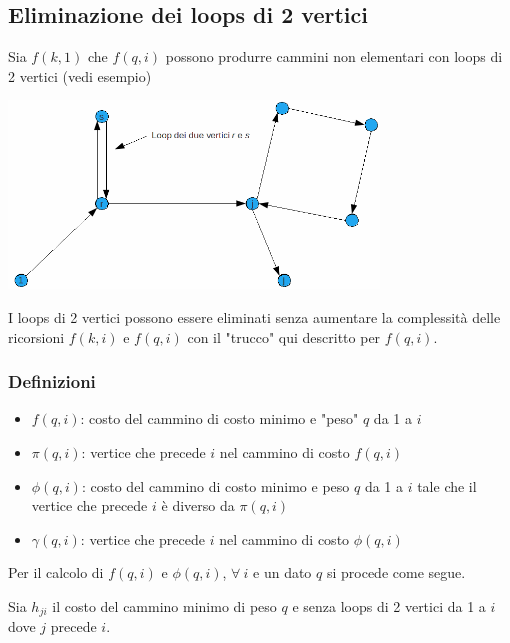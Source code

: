 \subsection{Eliminazione dei loops di 2 vertici}
Sia $f(k,1)$ che $f(q,i)$ possono produrre cammini non elementari con loops di 2 vertici (vedi esempio)

\centerline{\includegraphics[height=5cm]{images/graph48.png}}
I loops di 2 vertici possono essere eliminati senza aumentare la complessità delle ricorsioni $f(k,i)$ e $f(q,i)$ con il "trucco" qui descritto per $f(q,i)$.
\clearpage
\subsubsection{Definizioni}
\begin{itemize}
	\item $f(q,i)$: costo del cammino di costo minimo e "peso" $q$ da 1 a $i$
	\item $\pi(q,i)$: vertice che precede $i$ nel cammino di costo $f(q,i)$
	\item $\phi(q,i)$: costo del cammino di costo minimo e peso $q$ da 1 a $i$ tale che il vertice che precede $i$ è diverso da $\pi(q,i)$
	\item $\gamma(q,i)$: vertice che precede $i$ nel cammino di costo $\phi(q,i)$
\end{itemize}

Per il calcolo di $f(q,i)$ e $\phi(q,i)$, $\forall\ i$ e un dato $q$ si procede come segue.

Sia $h_{ji}$ il costo del cammino minimo di peso $q$ e senza loops di 2 vertici da 1 a $i$ dove $j$ precede $i$.


